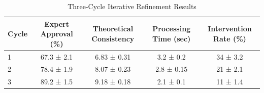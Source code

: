 
\begin{table}[ht]
\centering
\caption{Three-Cycle Iterative Refinement Results}
\label{tab:cycle-refinement}
\begin{tabular}{lcccc}
\toprule
Cycle & Expert Approval (\%) & Theoretical Consistency & Processing Time (sec) & Intervention Rate (\%) \\
\midrule
1 & 67.3 ± 2.1 & 6.83 ± 0.31 & 3.2 ± 0.2 & 34 ± 3.2 \\
2 & 78.4 ± 1.9 & 8.07 ± 0.23 & 2.8 ± 0.15 & 21 ± 2.1 \\
3 & 89.2 ± 1.5 & 9.18 ± 0.18 & 2.1 ± 0.1 & 11 ± 1.4 \\
\bottomrule
\end{tabular}
\end{table}
